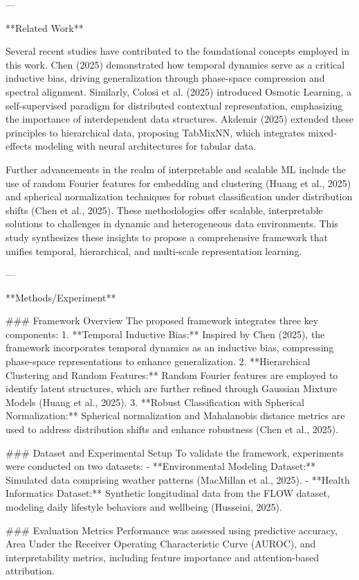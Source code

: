 ---

**Related Work**  

Several recent studies have contributed to the foundational concepts employed in this work. Chen (2025) demonstrated how temporal dynamics serve as a critical inductive bias, driving generalization through phase-space compression and spectral alignment. Similarly, Colosi et al. (2025) introduced Osmotic Learning, a self-supervised paradigm for distributed contextual representation, emphasizing the importance of interdependent data structures. Akdemir (2025) extended these principles to hierarchical data, proposing TabMixNN, which integrates mixed-effects modeling with neural architectures for tabular data.  

Further advancements in the realm of interpretable and scalable ML include the use of random Fourier features for embedding and clustering (Huang et al., 2025) and spherical normalization techniques for robust classification under distribution shifts (Chen et al., 2025). These methodologies offer scalable, interpretable solutions to challenges in dynamic and heterogeneous data environments. This study synthesizes these insights to propose a comprehensive framework that unifies temporal, hierarchical, and multi-scale representation learning.

---

**Methods/Experiment**  

### Framework Overview  
The proposed framework integrates three key components:  
1. **Temporal Inductive Bias:** Inspired by Chen (2025), the framework incorporates temporal dynamics as an inductive bias, compressing phase-space representations to enhance generalization.  
2. **Hierarchical Clustering and Random Features:** Random Fourier features are employed to identify latent structures, which are further refined through Gaussian Mixture Models (Huang et al., 2025).  
3. **Robust Classification with Spherical Normalization:** Spherical normalization and Mahalanobis distance metrics are used to address distribution shifts and enhance robustness (Chen et al., 2025).  

### Dataset and Experimental Setup  
To validate the framework, experiments were conducted on two datasets:  
- **Environmental Modeling Dataset:** Simulated data comprising weather patterns (MacMillan et al., 2025).  
- **Health Informatics Dataset:** Synthetic longitudinal data from the FLOW dataset, modeling daily lifestyle behaviors and wellbeing (Husseini, 2025).  

### Evaluation Metrics  
Performance was assessed using predictive accuracy, Area Under the Receiver Operating Characteristic Curve (AUROC), and interpretability metrics, including feature importance and attention-based attribution.

